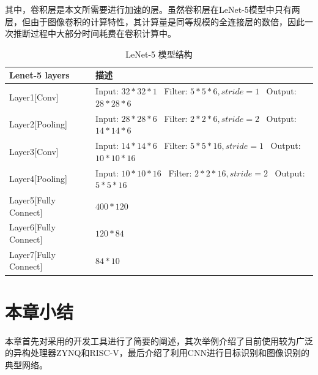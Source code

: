     其中，卷积层是本文所需要进行加速的层。虽然卷积层在LeNet-5模型中只有两层，但由于图像卷积的计算特性，其计算量是同等规模的全连接层的数倍，因此一次推断过程中大部分时间耗费在卷积计算中。
    \begin{table}[h] %
        \centering
        \caption{LeNet-5 模型结构} %
        \begin{tabular}{l|l} %
        \hline  
        Lenet-5 layers & 描述 \\
        \hline %
        Layer1[Conv] & Input: $32*32*1$ \  Filter: $5*5*6, stride=1$ \  Output: $28*28*6$ \\
        \hline  
        Layer2[Pooling] & Input: $28*28*6$ \  Filter: $2*2*6, stride=2$ \  Output: $14*14*6$ \\
        \hline  
        Layer3[Conv] & Input: $14*14*6$ \  Filter: $5*5*16, stride=1$ \  Output: $10*10*16$ \\
        \hline  
        Layer4[Pooling] & Input: $10*10*16$ \  Filter: $2*2*16, stride=2$ \  Output: $5*5*16$ \\
        \hline  
        Layer5[Fully Connect] & $400*120$ \\
        \hline  
        Layer6[Fully Connect] & $120*84$ \\
        \hline  
        Layer7[Fully Connect] & $84*10$  \\
        \hline  
        \end{tabular}
        \label{lenet5}
    \end{table}


\section{本章小结}
本章首先对采用的开发工具进行了简要的阐述，其次举例介绍了目前使用较为广泛的异构处理器ZYNQ和RISC-V，最后介绍了利用CNN进行目标识别和图像识别的典型网络。




